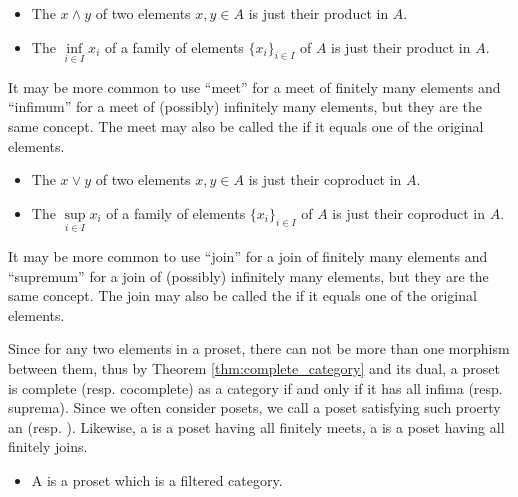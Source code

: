   \begin{itemize}
    \item The  $x\wedge y$ of two elements $x,y\in A$ is just their product in $A$.
    \item The  $\inf\limits_{i\in I}x_i$ of a family of elements $\{x_i\}_{i\in I}$ of $A$ is just their product in $A$.
  \end{itemize}
  \begin{rem}
    It may be more common to use ``meet'' for a meet of finitely many elements and ``infimum'' for a meet of (possibly) infinitely many elements, but they are the same concept. The meet may also be called the  if it equals one of the original elements.
  \end{rem}
  \begin{itemize}
    \item The  $x\vee y$ of two elements $x,y\in A$ is just their coproduct in $A$.
    \item The  $\sup\limits_{i\in I}x_i$ of a family of elements $\{x_i\}_{i\in I}$ of $A$ is just their coproduct in $A$.
  \end{itemize}
  \begin{rem}
    It may be more common to use ``join'' for a join of finitely many elements and ``supremum'' for a join of (possibly) infinitely many elements, but they are the same concept. The join may also be called the  if it equals one of the original elements.
  \end{rem}

  Since for any two elements in a proset, there can not be more than one morphism between them, thus by Theorem \ref{thm:complete_category} and its dual, a proset is complete (resp. cocomplete) as a category if and only if it has all infima (resp. suprema).
  Since we often consider posets, we call a poset satisfying such proerty an  (resp. ).
  Likewise, a  is a poset having all finitely meets, a  is a poset having all finitely joins.

  \begin{itemize}
    \item A  is a proset which is a filtered category.
  \end{itemize}
  
